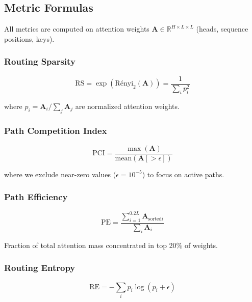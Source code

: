\subsection{Metric Formulas}

All metrics are computed on attention weights $\mathbf{A} \in \mathbb{R}^{H \times L \times L}$ (heads, sequence positions, keys).

\subsubsection{Routing Sparsity}

\begin{equation}
\text{RS} = \exp\left( \text{Rényi}_2(\mathbf{A}) \right) = \frac{1}{\sum_{i} p_i^2}
\end{equation}

where $p_i = \mathbf{A}_i / \sum_j \mathbf{A}_j$ are normalized attention weights.

\subsubsection{Path Competition Index}

\begin{equation}
\text{PCI} = \frac{\max(\mathbf{A})}{\text{mean}(\mathbf{A}[>\epsilon])}
\end{equation}

where we exclude near-zero values ($\epsilon = 10^{-5}$) to focus on active paths.

\subsubsection{Path Efficiency}

\begin{equation}
\text{PE} = \frac{\sum_{i=1}^{0.2L} \mathbf{A}_{\text{sorted}i}}{\sum_i \mathbf{A}_i}
\end{equation}

Fraction of total attention mass concentrated in top 20\% of weights.

\subsubsection{Routing Entropy}

\begin{equation}
\text{RE} = -\sum_i p_i \log(p_i + \epsilon)
\end{equation}

